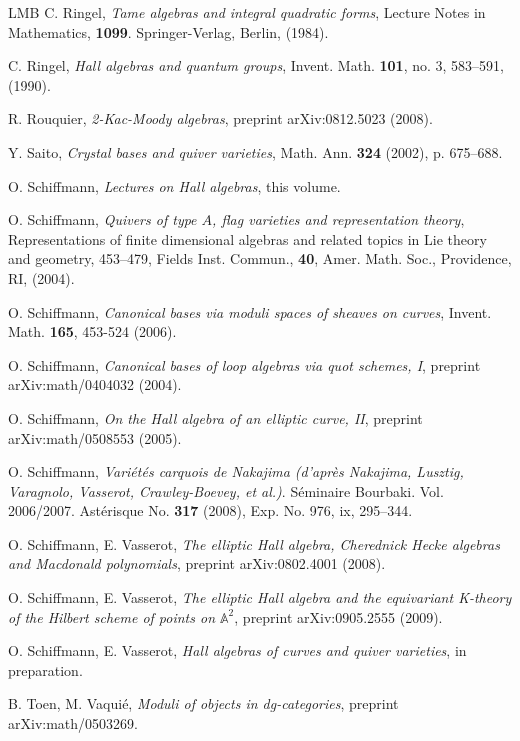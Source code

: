 \documentclass[a4paper,10pt]{amsart}
\numberwithin{equation}{section}
\begin{document}
{\begin{thebibliography}{LMB}
C. Ringel, \emph{Tame algebras and integral quadratic forms}, Lecture Notes in Mathematics, \textbf{1099}. Springer-Verlag, Berlin, (1984).

C. Ringel, \emph{Hall algebras and quantum groups},  Invent. Math.
\textbf{101},  no. 3, 583--591, (1990).

R. Rouquier, \emph{ 2-Kac-Moody algebras}, preprint arXiv:0812.5023 (2008).

Y. Saito, \emph{Crystal bases and quiver varieties}, Math. Ann. \textbf{324} (2002), p. 675--688.

O. Schiffmann, \emph{Lectures on Hall algebras}, this volume.

O. Schiffmann, \emph{Quivers of type $A$, flag varieties and representation theory}, Representations of finite dimensional algebras and related topics in Lie theory and geometry, 453--479, Fields Inst. Commun., \textbf{40}, Amer. Math. Soc., Providence, RI, (2004).

O. Schiffmann, \emph{Canonical bases via moduli spaces of sheaves on curves}, Invent. Math. \textbf{165}, 453-524 (2006).

O. Schiffmann, \emph{Canonical bases of loop algebras via quot schemes, I}, preprint arXiv:math/0404032 (2004).

O. Schiffmann, \emph{On the Hall algebra of an elliptic curve, II}, preprint arXiv:math/0508553 (2005).

O. Schiffmann, \emph{Vari\'et\'es carquois de Nakajima (d'apr\`es Nakajima, Lusztig, Varagnolo, Vasserot, Crawley-Boevey, et al.)}. S\'eminaire Bourbaki. Vol. 2006/2007. Ast\'erisque No. \textbf{317} (2008), Exp. No. 976, ix, 295--344.

O. Schiffmann, E. Vasserot, \emph{The elliptic Hall algebra, Cherednick Hecke algebras and Macdonald polynomials}, preprint arXiv:0802.4001 (2008).

O. Schiffmann, E. Vasserot, \emph{The elliptic Hall algebra and the equivariant K-theory of the Hilbert scheme of points on $\mathbb{A}^2$}, preprint arXiv:0905.2555 (2009).

O. Schiffmann, E. Vasserot, \emph{Hall algebras of curves and quiver varieties}, in preparation. 

B. Toen, M. Vaqui\'e, \emph{Moduli of objects in dg-categories}, preprint arXiv:math/0503269.


\end{thebibliography}}
\end{document}
